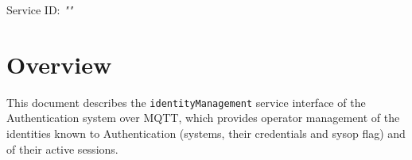 \documentclass[a4paper]{arrowhead}
\begin{document}
\sloppy

\ArrowheadSetup

\begin{center}
  \vspace*{1cm}
  \huge{\arrowtitle}

  \vspace*{0.2cm}
  \LARGE{\arrowtype}
  \vspace*{1cm}

  \Large{Service ID: \textit{"\arrowid"}}

  \vspace*{\fill}


  \vspace*{1cm}
  \vspace*{\fill}

  \begin{abstract}
    This document describes the MQTT protocol with TLS payload security and JSON payload encoding variant of the \texttt{identityManagement} service of the Authentication system.
  \end{abstract}

  \vspace*{1cm}
\end{center}

\newpage

\tableofcontents
\newpage

\section{Overview}
\label{sec:overview}

This document describes the \texttt{identityManagement} service interface of the Authentication system over MQTT, which provides operator management of the identities known to Authentication (systems, their credentials and sysop flag) and of their active sessions.
\end{document}
